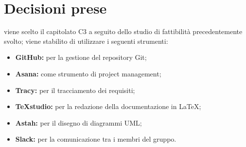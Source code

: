 \documentclass[a4paper,11pt]{article}
\begin{document}
	\section{Decisioni prese}
	\begin{itemize}
		\itemVI viene scelto il capitolato C3 a seguito dello studio di fattibilità precedentemente svolto;
		\itemVI viene stabilito di utilizzare i seguenti strumenti:
			\begin{itemize}
				\item {\textbf{GitHub:} per la gestione del repository Git};
				\item {\textbf{Asana:} come strumento di project management};
				\item {\textbf{Tracy:} per il tracciamento dei requisiti};
				\item {\textbf{TeXstudio:} per la redazione della documentazione in LaTeX};
				\item {\textbf{Astah:} per il disegno di diagrammi UML};
				\item {\textbf{Slack:} per la comunicazione tra i membri del gruppo}.
			\end{itemize}
	\end{itemize}
\end{document}
